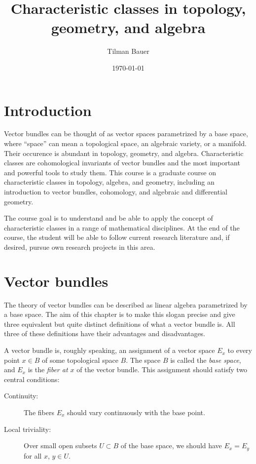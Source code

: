 \documentclass[a4paper,openany]{scrbook}
\title{Characteristic classes in topology, geometry, and algebra}
\author{Tilman Bauer}
\date{\today{}}
\begin{document}
\frontmatter
\maketitle

\mainmatter

\chapter{Introduction}

Vector bundles can be thought of as vector spaces parametrized by a base space, where ``space'' can mean a topological space, an algebraic variety, or a manifold. Their occurence is abundant in topology, geometry, and algebra. Characteristic classes are cohomological invariants of vector bundles and the most important and powerful tools to study them. This course is a graduate course on characteristic classes in topology, algebra, and geometry, including an introduction to vector bundles, cohomology, and algebraic and differential geometry.

The course goal is to understand and be able to apply the concept of characteristic classes in a range of mathematical disciplines. At the end of the course, the student will be able to follow current research literature and, if desired, pursue own research projects in this area.



\tableofcontents

\chapter{Vector bundles}

The theory of vector bundles can be described as linear algebra parametrized by a base space. The aim of this chapter is to make this slogan precise and give three equivalent but quite distinct definitions of what a vector bundle is. All three of these definitions have their advantages and disadvantages.

A vector bundle is, roughly speaking, an assignment of a vector space $E_x$ to every point $x \in B$ of some topological space $B$. The space $B$ is called the \emph{base space}, and $E_x$ is the \emph{fiber at $x$} of the vector bundle. This assignment should satisfy two central conditions:

\begin{description}
\item[Continuity:] The fibers $E_x$ should vary continuously with the base point.
\item[Local triviality:] Over small open subsets $U \subset B$ of the base space, we should have $E_x = E_y$ for all $x$, $y \in U$.
\end{description}
\end{document}
